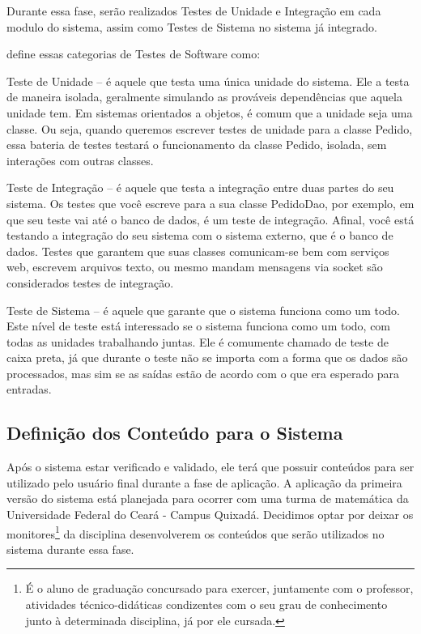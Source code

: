 Durante essa fase, ser\~ao realizados Testes de Unidade e Integra\c{c}\~ao em 
cada modulo do sistema, assim como Testes de Sistema no sistema j\'a integrado.

 define essas categorias de Testes de Software como:

\begin{alineascomponto}
	\item Teste de Unidade -- é aquele que testa uma única unidade do sistema. 
Ele a testa de maneira isolada, geralmente simulando as prováveis dependências 
que aquela unidade tem. Em sistemas orientados a objetos, é comum que a unidade 
seja uma classe. Ou seja, quando queremos escrever testes de unidade para a 
classe Pedido, essa bateria de testes testará o funcionamento da classe Pedido, 
isolada, sem interações com outras classes.

	\item  Teste de Integração -- é aquele que testa a integração entre duas 
partes do seu sistema. Os testes que você escreve para a sua classe PedidoDao, 
por exemplo, em que seu teste vai até o banco de dados, é um teste de integração. 
Afinal, você está testando a integração do seu sistema com o sistema externo, 
que é o banco de dados. Testes que garantem que suas classes comunicam-se bem 
com serviços web, escrevem arquivos texto, ou mesmo mandam mensagens via socket 
são considerados testes de integração.

	\item Teste de Sistema -- \'e aquele que garante que o sistema funciona como um todo. Este 
nível de teste está interessado se o sistema funciona como um todo, com todas as 
unidades trabalhando juntas. Ele é comumente chamado de teste de caixa preta, já 
que durante o teste n\~ao se importa com a forma que os dados s\~ao processados, mas sim se as sa\'idas est\~ao de acordo com o que era esperado para entradas. 
\end{alineascomponto}

\subsection{Definição dos Conteúdo para o Sistema}

Após o sistema estar verificado e validado, ele terá que possuir conteúdos para ser utilizado pelo usuário final durante a fase de aplicação. A aplicação da primeira versão do sistema está planejada 
para ocorrer com uma turma de matemática da Universidade Federal do Ceará - Campus Quixadá. Decidimos optar por deixar os monitores\footnote{É o aluno de graduação concursado para exercer, juntamente 
com o professor, atividades técnico-didáticas condizentes com o seu grau de conhecimento junto à determinada disciplina, já por ele cursada.} da disciplina desenvolverem os conteúdos que ser\~ao 
utilizados no sistema durante essa fase. 

